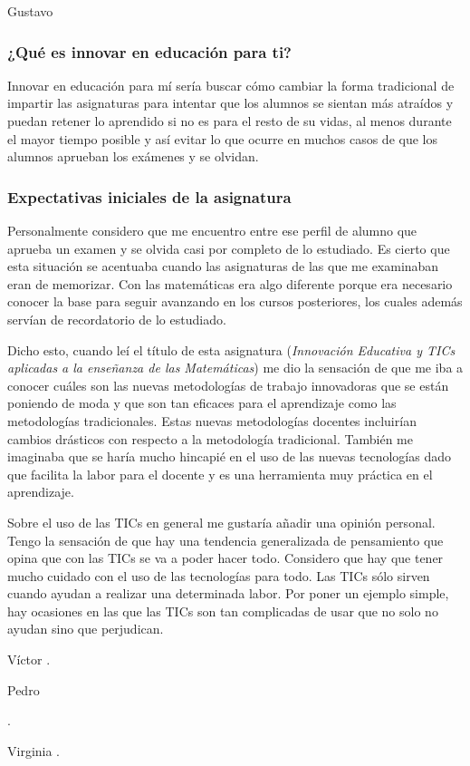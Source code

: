 
\begin{opin}{\guscolor}{Gustavo}


\subsubsection{¿Qué es innovar en educación para ti?}
Innovar en educación para mí sería buscar cómo cambiar la forma tradicional de impartir las asignaturas para intentar que los alumnos se sientan más atraídos y puedan retener lo aprendido si no es para el resto de su vidas, al menos durante el mayor tiempo posible y así evitar lo que ocurre en muchos casos de que los alumnos aprueban los exámenes y se olvidan.


\subsubsection{Expectativas iniciales de la asignatura}
Personalmente considero que me encuentro entre ese perfil de alumno que aprueba un examen y se olvida casi por completo de  lo estudiado. Es cierto que esta situación se acentuaba cuando las asignaturas de las que me examinaban eran de memorizar. Con las matemáticas era algo diferente porque era necesario conocer la base para seguir avanzando en los cursos posteriores, los cuales además servían de recordatorio de lo estudiado.


Dicho esto, cuando leí el título de esta asignatura (\textit{Innovación Educativa y TICs aplicadas a la enseñanza de las Matemáticas}) me dio la sensación de que me iba a conocer cuáles son las nuevas metodologías de trabajo innovadoras que se están poniendo de moda y que son tan eficaces para el aprendizaje como las metodologías tradicionales. Estas nuevas metodologías docentes incluirían cambios drásticos con respecto a la metodología tradicional. También me imaginaba que se haría mucho hincapié en el uso de las nuevas tecnologías dado que facilita la labor para el docente y es una herramienta muy práctica en el aprendizaje.


Sobre el uso de las TICs en general me gustaría añadir una opinión personal. Tengo la sensación de que hay una tendencia generalizada de pensamiento que opina que con las TICs se va a poder hacer todo. Considero que hay que tener mucho cuidado con el uso de las tecnologías para todo. Las TICs sólo sirven cuando ayudan a realizar una determinada labor. Por poner un ejemplo simple, hay ocasiones en las que las TICs son tan complicadas de usar que no solo no ayudan sino que perjudican.

\end{opin}

\begin{opin}{\victorcolor}{Víctor}
.


\end{opin}

\begin{opin}{\pedrocolor}{Pedro}

.


\end{opin}

\begin{opin}{\virgicolor}{Virginia}
.


\end{opin}
